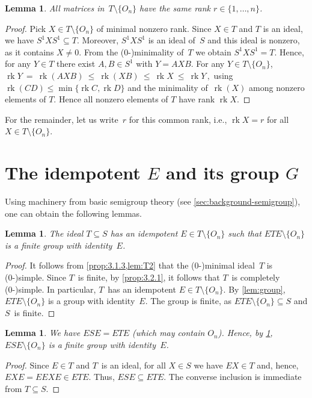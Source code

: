 \documentclass{lmcs}
\newtheorem{lemma}[thm]{Lemma}
\theoremstyle{definition}
\newcommand{\rk}{\operatorname{rk}}
\begin{document}
\begin{lemma} \label{lem:same-rank}
All matrices in~$T \setminus \{O_n\}$ have the same rank $r \in \{1, \ldots, n\}$.
\end{lemma}
\begin{proof}
Pick $X \in T \setminus \{O_n\}$ of minimal nonzero rank.
Since $X \in T$ and $T$ is an ideal, we have $S^1 X S^1 \subseteq T$.
Moreover, $S^1 X S^1$ is an ideal of~$S$ and this ideal is nonzero, as it contains $X \ne 0$.
From the \mbox{(0-)}minimality of~$T$ we obtain $S^1 X S^1 = T$.
Hence, for any $Y \in T$ there exist $A, B \in S^1$ with $Y = A X B$.
For any $Y \in T \setminus \{O_n\}$,
$
\rk Y \ = \ \rk(A X B) \ \le \ \rk(X B) \ \le \ \rk X \ \le \ \rk Y\,,
$
using $\rk(C D)\le \min\{\rk C, \rk D\}$ and the minimality of~$\rk(X)$ among nonzero elements of $T$.
Hence all nonzero elements of $T$ have rank $\rk X$.
\end{proof}

For the remainder, let us write~$r$ for this common rank, i.e., $\rk X = r$ for all $X \in T \setminus \{O_n\}$.


\section{The idempotent \texorpdfstring{$E$}{E} and its group \texorpdfstring{$G$}{G}}
\label{sub:G}

Using machinery from basic semigroup theory (see \cref{sec:background-semigroup}), one can obtain the following lemmas.

\begin{lemma} \label{lem:ideal-completely-0-simple}
The ideal $T \subseteq S$ has an idempotent $E \in T \setminus \{O_n\}$ such that $E T E \setminus \{O_n\}$ is a finite group with identity~$E$.
\end{lemma}
\begin{proof}%
It follows from \cref{prop:3.1.3,lem:T2} that the \mbox{(0-)}minimal ideal~$T$ is \mbox{(0-)}simple.
Since $T$~is finite, by \cref{prop:3.2.1}, it follows that $T$~is completely \mbox{(0-)}simple.
In particular, $T$~has an idempotent $E \in T \setminus \{O_n\}$.
By \cref{lem:group}, $E T E \setminus \{O_n\}$ is a group with identity~$E$.
The group is finite, as $E T E \setminus \{O_n\} \subseteq S$ and $S$~is finite.
\end{proof}


\begin{lemma} \label{lem:ESE=ETE}
We have $E S E = E T E$ (which may contain $O_n$).
Hence, by \cref{lem:ideal-completely-0-simple}, $E S E \setminus \{O_n\}$ is a finite group with identity~$E$.
\end{lemma}
\begin{proof}
Since $E \in T$ and $T$~is an ideal, for all $X \in S$ we have $E X \in T$ and, hence, $E X E = E E X E \in E T E$.
Thus, $E S E \subseteq E T E$.
The converse inclusion is immediate from $T \subseteq S$.
\end{proof}
\end{document}
